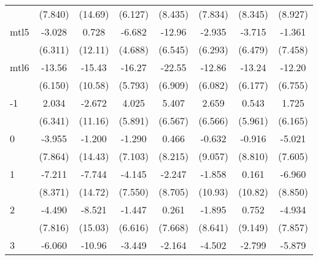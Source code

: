 \documentclass{article}
\begin{document}
{\begin{longtable}{l*{7}{c}}
                &  (7.840)         &  (14.69)         &  (6.127)         &  (8.435)         &  (7.834)         &  (8.345)         &  (8.927)         \\
mtl5            &   -3.028         &    0.728         &   -6.682         &   -12.96         &   -2.935         &   -3.715         &   -1.361         \\
                &  (6.311)         &  (12.11)         &  (4.688)         &  (6.545)         &  (6.293)         &  (6.479)         &  (7.458)         \\
mtl6            &   -13.56\sym{*}  &   -15.43         &   -16.27\sym{**} &   -22.55\sym{**} &   -12.86\sym{*}  &   -13.24\sym{*}  &   -12.20         \\
                &  (6.150)         &  (10.58)         &  (5.793)         &  (6.909)         &  (6.082)         &  (6.177)         &  (6.755)         \\
-1              &    2.034         &   -2.672         &    4.025         &    5.407         &    2.659         &    0.543         &    1.725         \\
                &  (6.341)         &  (11.16)         &  (5.891)         &  (6.567)         &  (6.566)         &  (5.961)         &  (6.165)         \\
0               &   -3.955         &   -1.200         &   -1.290         &    0.466         &   -0.632         &   -0.916         &   -5.021         \\
                &  (7.864)         &  (14.43)         &  (7.103)         &  (8.215)         &  (9.057)         &  (8.810)         &  (7.605)         \\
1               &   -7.211         &   -7.744         &   -4.145         &   -2.247         &   -1.858         &    0.161         &   -6.960         \\
                &  (8.371)         &  (14.72)         &  (7.550)         &  (8.705)         &  (10.93)         &  (10.82)         &  (8.850)         \\
2               &   -4.490         &   -8.521         &   -1.447         &    0.261         &   -1.895         &    0.752         &   -4.934         \\
                &  (7.816)         &  (15.03)         &  (6.616)         &  (7.668)         &  (8.641)         &  (9.149)         &  (7.857)         \\
3               &   -6.060         &   -10.96         &   -3.449         &   -2.164         &   -4.502         &   -2.799         &   -5.879         \\

\end{longtable}}
\end{document}
